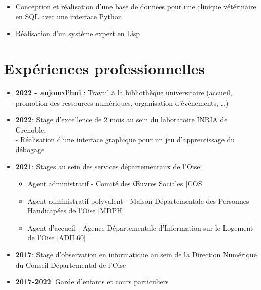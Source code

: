 \documentclass[9pt, oneside, a4paper, titlepage]{extarticle}
\begin{document}
\begin{tcolorbox}
\begin{minipage}[t]{12.8cm}
\begin{tcolorbox}[grow to right by = 0.6cm, colback = gray!25, colframe = white]
\begin{itemize}
                    \item Conception et réalisation d'une base de données pour une clinique vétérinaire en SQL avec une interface Python
                    
                    \item Réalisation d'un système expert en Lisp
                \end{itemize}
                
                \section*{Expériences professionnelles}
                \begin{itemize}
                    \item \textbf{2022 - aujourd'hui }: Travail à la bibliothèque universitaire (accueil, promotion des ressources numériques, organisation d'événements, \ldots)
                    \item \textbf{2022}: Stage d'excellence de 2 mois au sein du laboratoire INRIA 
                    de Grenoble. \\   - Réalisation d'une 
                    interface graphique pour un jeu d'apprentissage
                    du débogage
                    \item \textbf{2021}: Stages au sein des services départementaux de l’Oise:
                    \begin{itemize}
                        \item Agent administratif - Comité des Œuvres Sociales [COS]
                        \item Agent administratif polyvalent - Maison Départementale des Personnes Handicapées de l’Oise [MDPH]
                        \item Agent d’accueil - Agence Départementale d’Information sur le Logement de l’Oise [ADIL60]

                    \end{itemize}
                    \item \textbf{2017}: Stage d’observation en informatique au sein de la Direction Numérique du Conseil Départemental de l'Oise
                    
                    \item \textbf{2017-2022}: Garde d’enfants et cours particuliers
                \end{itemize}


\end{tcolorbox}
\end{minipage}
\end{tcolorbox}
\end{document}
